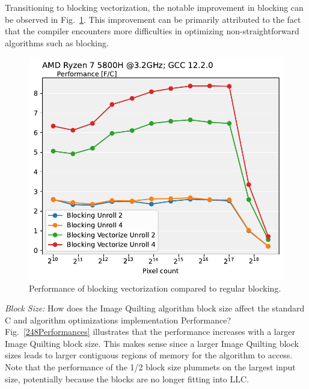 \documentclass[letterpaper]{article}
\begin{document}
Transitioning to blocking vectorization, the notable improvement in blocking can be observed in Fig.~\ref{vectorizeBlock}. This improvement can be primarily attributed to the fact that the compiler encounters more difficulties in optimizing non-straightforward algorithms such as blocking.
\begin{figure}[htb]
\centering
  \includegraphics[scale=0.5]{VectorizeBlockingPlot.pdf}
  \caption{Performance of blocking vectorization compared to regular blocking.
  \label{vectorizeBlock}}
\end{figure}

\textit{Block Size:} How does the Image Quilting algorithm block size affect the standard C and algorithm optimizations implementation Performance? Fig.~\ref{248Performances} illustrates that the performance increases with a larger Image Quilting block size. This makes sense since a larger Image Quilting block sizes leads to larger contiguous regions of memory for the algorithm to access. Note that the performance of the 1/2 block size plummets on the largest input size, potentially because the blocks are no longer fitting into LLC.
\end{document}
